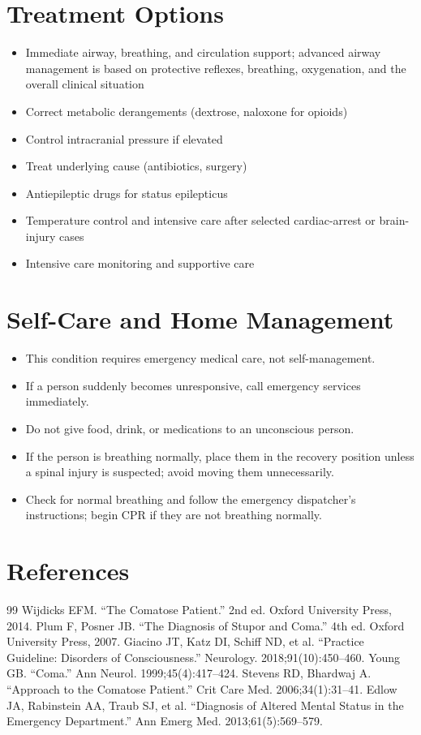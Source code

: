\section*{Treatment Options}
\begin{itemize}
 \item Immediate airway, breathing, and circulation support; advanced airway management is based on protective reflexes, breathing, oxygenation, and the overall clinical situation
\item Correct metabolic derangements (dextrose, naloxone for opioids)
\item Control intracranial pressure if elevated
\item Treat underlying cause (antibiotics, surgery)
\item Antiepileptic drugs for status epilepticus
 \item Temperature control and intensive care after selected cardiac-arrest or brain-injury cases
\item Intensive care monitoring and supportive care
\end{itemize}
\section*{Self-Care and Home Management}
\begin{itemize}
\item This condition requires emergency medical care, not self-management.
\item If a person suddenly becomes unresponsive, call emergency services immediately.
\item Do not give food, drink, or medications to an unconscious person.
 \item If the person is breathing normally, place them in the recovery position unless a spinal injury is suspected; avoid moving them unnecessarily.
 \item Check for normal breathing and follow the emergency dispatcher's instructions; begin CPR if they are not breathing normally.
\end{itemize}

\section*{References}
\begin{thebibliography}{99}
 Wijdicks EFM. ``The Comatose Patient.'' 2nd ed. Oxford University Press, 2014.
 Plum F, Posner JB. ``The Diagnosis of Stupor and Coma.'' 4th ed. Oxford University Press, 2007.
 Giacino JT, Katz DI, Schiff ND, et al. ``Practice Guideline: Disorders of Consciousness.'' Neurology. 2018;91(10):450--460.
 Young GB. ``Coma.'' Ann Neurol. 1999;45(4):417--424.
 Stevens RD, Bhardwaj A. ``Approach to the Comatose Patient.'' Crit Care Med. 2006;34(1):31--41.
 Edlow JA, Rabinstein AA, Traub SJ, et al. ``Diagnosis of Altered Mental Status in the Emergency Department.'' Ann Emerg Med. 2013;61(5):569--579.
\end{thebibliography}
